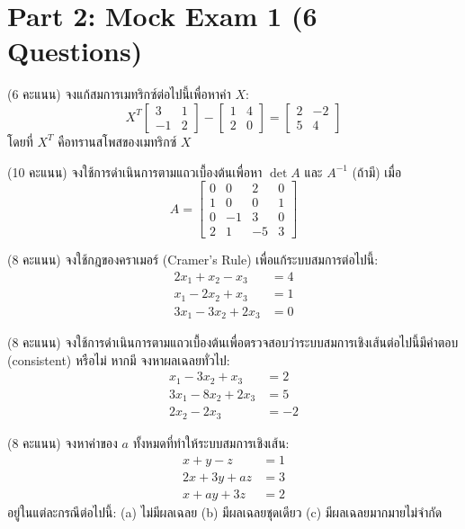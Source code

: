 ﻿\documentclass[12pt, a4paper]{exam}
\begin{document}
\filbreak
\section*{Part 2: Mock Exam 1 (6 Questions)}
\begin{questions}

\question (6 คะแนน) จงแก้สมการเมทริกซ์ต่อไปนี้เพื่อหาค่า $X$:
\[
X^T \begin{bmatrix} 3 & 1 \\ -1 & 2 \end{bmatrix} - \begin{bmatrix} 1 & 4 \\ 2 & 0 \end{bmatrix} = \begin{bmatrix} 2 & -2 \\ 5 & 4 \end{bmatrix}
\]
โดยที่ $X^T$ คือทรานสโพสของเมทริกซ์ $X$
\vspace{5cm}

\question (10 คะแนน) จงใช้การดำเนินการตามแถวเบื้องต้นเพื่อหา $\det A$ และ $A^{-1}$ (ถ้ามี) เมื่อ
\[
A = \begin{bmatrix} 0 & 0 & 2 & 0 \\ 1 & 0 & 0 & 1 \\ 0 & -1 & 3 & 0 \\ 2 & 1 & -5 & 3 \end{bmatrix}
\]
\vspace{5cm}

\question (8 คะแนน) จงใช้กฎของคราเมอร์ (Cramer's Rule) เพื่อแก้ระบบสมการต่อไปนี้:
\[
\begin{aligned}
2x_1 + x_2 - x_3 &= 4 \\
x_1 - 2x_2 + x_3 &= 1 \\
3x_1 - 3x_2 + 2x_3 &= 0
\end{aligned}
\]
\vspace{5cm}

\question (8 คะแนน) จงใช้การดำเนินการตามแถวเบื้องต้นเพื่อตรวจสอบว่าระบบสมการเชิงเส้นต่อไปนี้มีคำตอบ (consistent) \mbox{หรือไม่} หากมี จงหาผลเฉลยทั่วไป:
\[
\begin{aligned}
x_1 - 3x_2 + x_3 &= 2 \\
3x_1 - 8x_2 + 2x_3 &= 5 \\
2x_2 - 2x_3 &= -2
\end{aligned}
\]
\vspace{5cm}

\question (8 คะแนน) จงหาค่าของ $a$ ทั้งหมดที่ทำให้ระบบสมการเชิงเส้น:
\[
\begin{aligned}
x + y - z &= 1 \\
2x + 3y + az &= 3 \\
x + ay + 3z &= 2
\end{aligned}
\]
อยู่ในแต่ละกรณีต่อไปนี้:
(a) ไม่มีผลเฉลย\vfill
(b) มีผลเฉลยชุดเดียว\vfill
(c) มีผลเฉลยมากมายไม่จำกัด
\vspace{5cm}


\end{questions}
\end{document}
